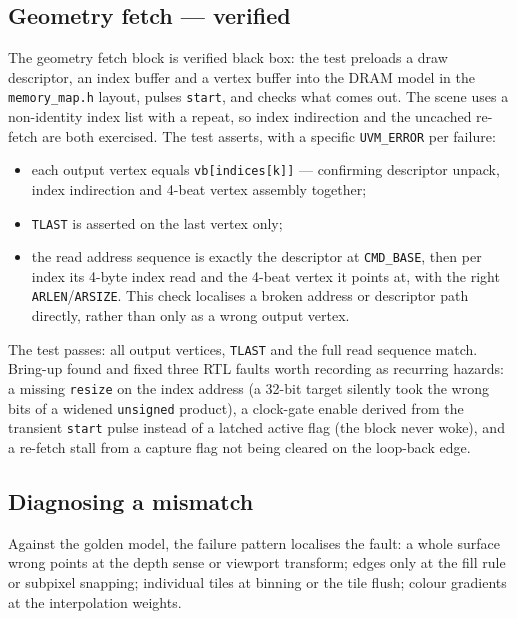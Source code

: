 \documentclass[11pt,a4paper]{article}
\begin{document}
\subsection{Geometry fetch --- verified}

The geometry fetch block is verified black box: the test preloads a draw
descriptor, an index buffer and a vertex buffer into the DRAM model in the
\texttt{memory\_map.h} layout, pulses \texttt{start}, and checks what comes out.
The scene uses a non-identity index list with a repeat, so index indirection and
the uncached re-fetch are both exercised. The test asserts, with a specific
\texttt{UVM\_ERROR} per failure:

\begin{itemize}[leftmargin=1.4em,itemsep=0.2em]
\item each output vertex equals \texttt{vb[indices[k]]} --- confirming descriptor
      unpack, index indirection and 4-beat vertex assembly together;
\item \texttt{TLAST} is asserted on the last vertex only;
\item the read address sequence is exactly the descriptor at \texttt{CMD\_BASE},
      then per index its 4-byte index read and the 4-beat vertex it points at,
      with the right \texttt{ARLEN}/\texttt{ARSIZE}. This check localises a
      broken address or descriptor path directly, rather than only as a wrong
      output vertex.
\end{itemize}

The test passes: all output vertices, \texttt{TLAST} and the full read sequence
match. Bring-up found and fixed three RTL faults worth recording as recurring
hazards: a missing \texttt{resize} on the index address (a 32-bit target
silently took the wrong bits of a widened \texttt{unsigned} product), a
clock-gate enable derived from the transient \texttt{start} pulse instead of a
latched active flag (the block never woke), and a re-fetch stall from a capture
flag not being cleared on the loop-back edge.

\subsection{Diagnosing a mismatch}

Against the golden model, the failure pattern localises the fault: a whole
surface wrong points at the depth sense or viewport transform; edges only at the
fill rule or subpixel snapping; individual tiles at binning or the tile flush;
colour gradients at the interpolation weights.
\end{document}
